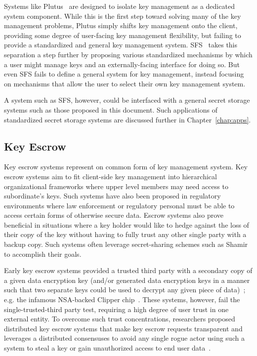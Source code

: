 Systems like Plutus~\cite{kallahalla2003} are designed to isolate key
management as a dedicated system component. While this is the first
step toward solving many of the key management problems, Plutus simply
shifts key management onto the client, providing some degree of
user-facing key management flexibility, but failing to provide a
standardized and general key management
system. SFS~\cite{mazieres1999} takes this separation a step further
by proposing various standardized mechanisms by which a user might
manage keys and an externally-facing interface for doing so. But even
SFS fails to define a general system for key management, instead
focusing on mechanisms that allow the user to select their own key
management system.

A system such as SFS, however, could be interfaced with a general
secret storage systems such as those proposed in this document. Such
applications of standardized secret storage systems are discussed
further in Chapter~\ref{chap:apps}.

\subsection{Key Escrow}

Key escrow systems represent on common form of key management system.
Key escrow systems aim to fit client-side key management into
hierarchical organizational frameworks where upper level members may
need access to subordinate's keys. Such systems have also been
proposed in regulatory environments where law enforcement or
regulatory personal must be able to access certain forms of otherwise
secure data. Escrow systems also prove beneficial in situations where
a key holder would like to hedge against the loss of their copy of the
key without having to fully trust any other single party with a backup
copy. Such systems often leverage secret-sharing schemes such as
Shamir~\cite{shamir1979} to accomplish their goals.

Early key escrow systems provided a trusted third party with a
secondary copy of a given data encryption key (and/or generated data
encryption keys in a manner such that two separate keys could be used
to decrypt any given piece of data)~\cite{denning1996}; e.g. the
infamous NSA-backed Clipper chip~\cite{whitehouse-clipper}. These
systems, however, fail the single-trusted-third party test, requiring
a high degree of user trust in one external entity. To overcome such
trust concentrations, researchers proposed distributed key escrow
systems that make key escrow requests transparent and leverages a
distributed consensuses to avoid any single rogue actor using such a
system to steal a key or gain unauthorized access to end user
data~\cite{blaze1996}.


